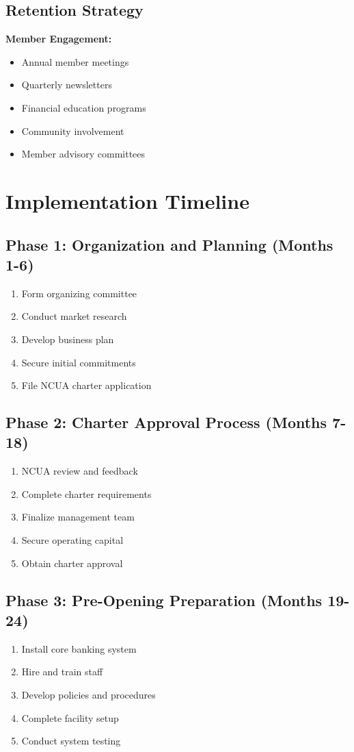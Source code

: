 \documentclass[11pt,letterpaper]{article}
\begin{document}
\subsection{Retention Strategy}
\textbf{Member Engagement:}
\begin{itemize}[leftmargin=*]
    \item Annual member meetings
    \item Quarterly newsletters
    \item Financial education programs
    \item Community involvement
    \item Member advisory committees
\end{itemize}

\section{Implementation Timeline}

\subsection{Phase 1: Organization and Planning (Months 1-6)}
\begin{enumerate}[leftmargin=*]
    \item Form organizing committee
    \item Conduct market research
    \item Develop business plan
    \item Secure initial commitments
    \item File NCUA charter application
\end{enumerate}

\subsection{Phase 2: Charter Approval Process (Months 7-18)}
\begin{enumerate}[leftmargin=*]
    \item NCUA review and feedback
    \item Complete charter requirements
    \item Finalize management team
    \item Secure operating capital
    \item Obtain charter approval
\end{enumerate}

\subsection{Phase 3: Pre-Opening Preparation (Months 19-24)}
\begin{enumerate}[leftmargin=*]
    \item Install core banking system
    \item Hire and train staff
    \item Develop policies and procedures
    \item Complete facility setup
    \item Conduct system testing
\end{enumerate}
\end{document}
